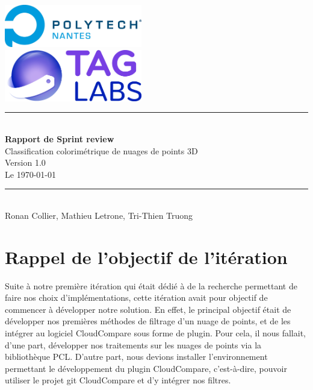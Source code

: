 \documentclass[12pt,titlepage,french]{article}
\begin{document}

\begin{titlepage}
\newcommand{\HRule}{\rule{\linewidth}{0.5mm}}
\center

  \includegraphics[width=0.45\textwidth]{../../ressources/img_logos/logo_polytech.png}\\[1cm]

  \includegraphics[width=0.45\textwidth]{../../ressources/img_logos/logo_taglabs.png}


\HRule \\[0.4cm]
{ \huge \bfseries Rapport de Sprint review\\[0.15cm] }
Classification colorimétrique de nuages de points 3D\\
Version 1.0\\
Le \today \\
\HRule \\[1.5cm]
Ronan Collier,
Mathieu Letrone,
Tri-Thien Truong
\\[1cm]
\end{titlepage}

\tableofcontents %
\newpage
\listoffigures  %
\newpage

\section{Rappel de l'objectif de l'itération}

Suite à notre première itération qui était dédié à de la recherche permettant de faire nos choix d'implémentations, cette itération avait pour objectif de commencer à développer notre solution. En effet, le principal objectif était de développer nos premières méthodes de filtrage d'un nuage de points, et de les intégrer au logiciel CloudCompare sous forme de plugin. Pour cela, il nous fallait, d'une part, développer nos traitements sur les nuages de points via la bibliothèque PCL. D'autre part, nous devions installer l'environnement permettant le développement du plugin CloudCompare, c'est-à-dire, pouvoir utiliser le projet git CloudCompare et d'y intégrer nos filtres.
\end{document}
